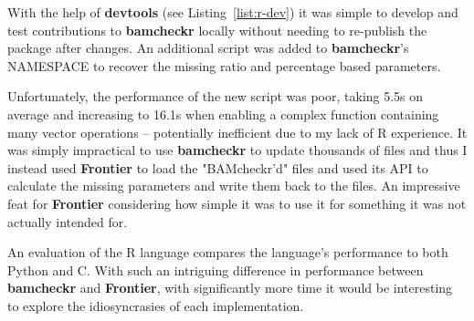 With the help of \textbf{devtools}\citep{man:devtools} (see
Listing~\ref{list:r-dev}) it was simple to develop and test contributions to
\textbf{bamcheckr} locally without needing to re-publish the package after
changes. An additional script was added to \textbf{bamcheckr}'s NAMESPACE to
recover the missing ratio and percentage based parameters.

Unfortunately, the performance of the new script was poor, taking 5.5s on average
and increasing to 16.1s when enabling a complex function containing many vector
operations -- potentially inefficient due to my lack of R experience. It was
simply impractical to use \textbf{bamcheckr} to update thousands of files and
thus I instead used \textbf{Frontier} to load the "BAMcheckr'd" files and used
its API to calculate the missing parameters and write them back to the files.
An impressive feat for \textbf{Frontier} considering how simple it was to use it
for something it was not actually intended for.

An evaluation of the R language\citep{morandat-rperf} compares the language's
performance to both Python and C.
With such an intriguing difference in performance between \textbf{bamcheckr} and
\textbf{Frontier}, with significantly more
time it would be interesting to explore the idiosyncrasies of each
implementation.

